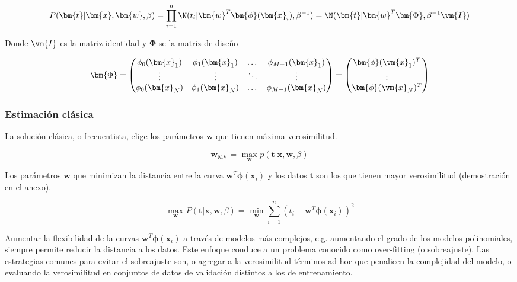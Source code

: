 \begin{equation}
P(\bm{t} | \bm{x}, \bm{w}, \beta) = \prod_{i=1}^n \N(t_i | \bm{w}^T \bm{\phi}(\bm{x}_i) , \beta^{-1}) = \N(\bm{t}|\bm{w}^T \bm{\Phi}, \beta^{-1} \vm{I})
\end{equation}

Donde $\vm{I}$ es la matriz identidad y $\bm{\Phi}$ se la matriz de diseño

\begin{equation}
 \bm{\Phi} =
  \begin{pmatrix}
    \phi_0(\bm{x}_1) & \phi_1(\bm{x}_1) & \dots & \phi_{M-1}(\bm{x}_1)\\
    \vdots & \vdots & \ddots & \vdots \\
    \phi_0(\bm{x}_N) & \phi_1(\bm{x}_N) & \dots & \phi_{M-1}(\bm{x}_N)
  \end{pmatrix}
  = 
  \begin{pmatrix}
   \bm{\phi}(\vm{x}_1)^T \\
   \vdots \\
   \bm{\phi}(\vm{x}_N)^T \\
  \end{pmatrix}
\end{equation}


\subsubsection{Estimaci\'on cl\'asica}

La soluci\'on cl\'asica, o frecuentista, elige los par\'ametros $\bm{w}$ que tienen máxima verosimilitud.

\begin{equation}
 \bm{w}_\text{MV} = \underset{\bm{w}}{\text{ max }} p(\bm{t} | \bm{x}, \bm{w}, \beta)
\end{equation}

Los par\'ametros $\bm{w}$ que minimizan la distancia entre la curva $\bm{w}^T\bm{\phi}(\bm{x}_i)$ y los datos $\bm{t}$ son los que tienen mayor verosimilitud (demostraci\'on en el anexo).

\begin{equation}
 \underset{\bm{w}}{\text{ max }} P(\bm{t} | \bm{x}, \bm{w}, \beta) = \underset{\bm{w}}{\text{ min }} \sum_{i=1}^{n}  (t_i - \bm{w}^T\bm{\phi}(\bm{x}_i))^2 
\end{equation}

Aumentar la flexibilidad de la curvas $\bm{w}^T\bm{\phi}(\bm{x}_i)$ a trav\'es de modelos m\'as complejos, e.g. aumentando el grado de los modelos polinomiales, siempre permite reducir la distancia a los datos.
Este enfoque conduce a un problema conocido como over-fitting (o sobreajuste).
Las estrategias comunes para evitar el sobreajuste son, o agregar a la verosimilitud t\'erminos ad-hoc que penalicen la complejidad del modelo, o evaluando la verosimilitud en conjuntos de datos de validaci\'on distintos a los de entrenamiento.


